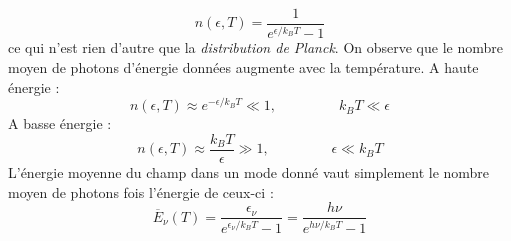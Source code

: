 \documentclass	[11pt, a4paper, openany]{book}
\begin{document}
		\begin{equation}
			n(\epsilon,T) = \dfrac{1}{e^{\epsilon/k_BT}-1}
		\end{equation}
		ce qui n'est rien d'autre que la \textit{distribution de Planck}. On observe que le nombre moyen de 
		photons d'énergie données augmente avec la température. A  haute énergie :
		\begin{equation}
			n(\epsilon,T) \approx e^{-\epsilon/k_BT} \ll 1,\ \ \ \ \ \ \ \ \ \ \ \ \ \ \ \ \ \ \ \  k_BT\ll\epsilon
		\end{equation}
		A basse énergie :
		\begin{equation}
			n(\epsilon,T) \approx \frac{k_BT}{\epsilon} \gg 1,\ \ \ \ \ \ \ \ \ \ \ \ \ \ \ \ \ \ \ \ \epsilon\ll k_BT
		\end{equation}
		L'énergie moyenne du champ dans un mode donné vaut simplement le nombre moyen de photons fois l'énergie 
		de ceux-ci :
		\begin{equation}
			\overline{E}_\nu(T) = \dfrac{\epsilon_\nu}{e^{\epsilon_\nu/k_BT}-1} = \dfrac{h\nu}{e^{h\nu/k_BT}-1}
			\label{eq:ResQuant}
		\end{equation}
		
		
\end{document}

